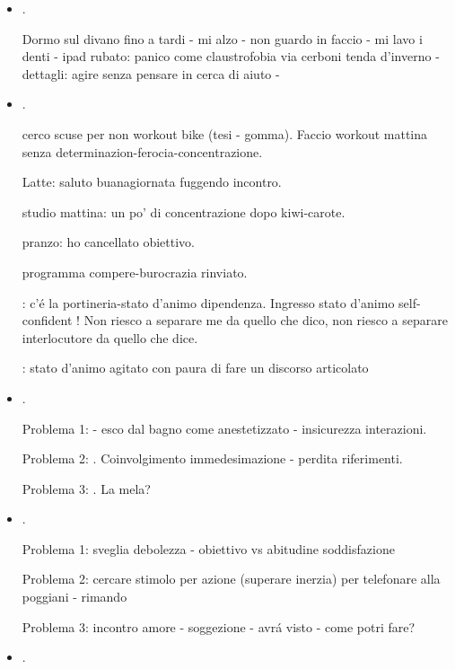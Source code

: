 \begin{itemize}
\item {}.

Dormo sul divano fino a tardi - mi alzo - non guardo in faccio - mi lavo i denti - ipad rubato: panico come claustrofobia via cerboni tenda d'inverno - dettagli: agire senza pensare in cerca di aiuto  - 



\item {}.

cerco scuse per non workout bike (tesi - gomma). Faccio workout mattina senza determinazion-ferocia-concentrazione.

Latte: saluto buanagiornata fuggendo incontro.

studio mattina: un po' di concentrazione dopo kiwi-carote.

pranzo: ho cancellato obiettivo.

programma compere-burocrazia rinviato.

: c'\'e la portineria-stato d'animo dipendenza. Ingresso stato d'animo self-confident
! Non riesco a separare me da quello che dico, non riesco a separare interlocutore da quello che dice.

: stato d'animo agitato con paura di fare un discorso articolato

\item {}.

Problema 1:  - esco dal bagno come anestetizzato - insicurezza interazioni.

Problema 2: . Coinvolgimento immedesimazione - perdita riferimenti.

Problema 3: . La mela? 


\item {}.

Problema 1: sveglia debolezza - obiettivo vs abitudine soddisfazione

Problema 2: cercare stimolo per azione (superare inerzia) per telefonare alla poggiani - rimando

Problema 3: incontro amore - soggezione - avr\'a visto - come potri fare?

\item {}.


\end{itemize}
